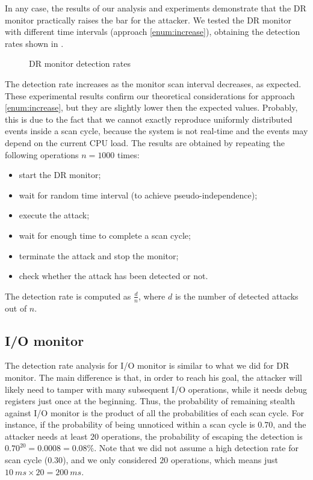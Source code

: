 In any case, the results of our analysis and experiments demonstrate that the DR monitor practically raises the bar for the attacker.
We tested the DR monitor with different time intervals (approach \ref{enum:increase}), obtaining the detection rates shown in .
\begin{figure}[h!]
\centering
{}
\caption{DR monitor detection rates}
\label{fig:dr-rates}
\end{figure}
The detection rate increases as the monitor scan interval decreases, as expected.
These experimental results confirm our theoretical considerations for approach \ref{enum:increase}, but they are slightly lower then the expected values.
Probably, this is due to the fact that we cannot exactly reproduce uniformly distributed events inside a scan cycle, because the system is not real-time
and the events may depend on the current CPU load. The results are obtained by repeating the following operations $n = 1000$ times:
\begin{itemize}
	\item start the DR monitor;
	\item wait for random time interval (to achieve pseudo-independence);
	\item execute the attack;
	\item wait for enough time to complete a scan cycle;
	\item terminate the attack and stop the monitor;
	\item check whether the attack has been detected or not.
\end{itemize}
The detection rate is computed as $\frac{d}{n}$, where $d$ is the number of detected attacks out of $n$.


\subsection{I/O monitor}

The detection rate analysis for I/O monitor is similar to what we did for DR monitor.
The main difference is that, in order to reach his goal, the attacker will likely need to tamper with many subsequent I/O operations,
while it needs debug registers just once at the beginning.
Thus, the probability of remaining stealth against I/O monitor is the product of all the probabilities of each scan cycle.
For instance, if the probability of being unnoticed within a scan cycle is $0.70$, and the attacker needs at least $20$ operations,
the probability of escaping the detection is $0.70^{20} = 0.0008 = 0.08\%$.
Note that we did not assume a high detection rate for scan cycle ($0.30$), and we only considered $20$ operations, which means just $\SI{10}{ms} \times 20 = \SI{200}{ms}$.

